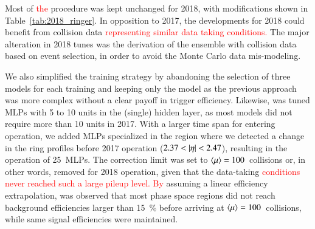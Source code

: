 Most of \textcolor{red}{the} procedure was kept unchanged for 2018, with modifications shown in
Table~\ref{tab:2018_ringer}.
In opposition to 2017, the developments for 2018
could benefit from collision data 
\textcolor{red}{representing similar data taking conditions.}
The major alteration in 2018 tunes was the derivation of the \rnn{} ensemble with collision data based on \Zee{} \tnp{} event selection, in order to avoid the Monte Carlo data mis-modeling.

We also simplified the training strategy by abandoning the selection of three
models for each training and keeping only the \spmax{} model as the previous approach was more complex without a clear
payoff in trigger efficiency.
Likewise, was tuned MLPs with 5 to 10 units in the (single) hidden layer, as most models did not require
more than 10 units in 2017. With a larger time span for entering operation, we
added MLPs specialized in the region where we detected a change in the ring
profiles before 2017 operation ($2.37<\abseta<2.47$), resulting in the operation of
\SI{25}{MLPs}. The correction limit was set to
$\langle \mu \rangle{}=100$~collisions or, in other words, removed for 2018 operation, given
that the data-taking 
\textcolor{red}{conditions never reached such a large pileup level. By}
assuming a linear efficiency extrapolation,%
was observed that most phase space regions did not reach background efficiencies
larger than \SI{15}{\%} before arriving at $\langle \mu \rangle=100$~collisions, while same
signal efficiencies were maintained.






